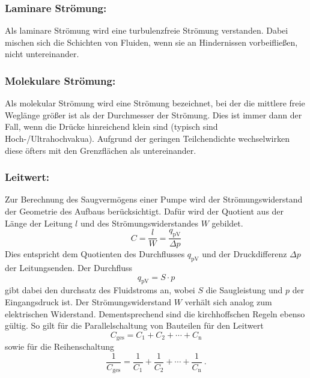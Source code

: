 \subsubsection{Laminare Strömung:}
Als laminare Strömung wird eine turbulenzfreie Strömung verstanden. Dabei mischen sich die Schichten von Fluiden, wenn sie an Hindernissen vorbeifließen, nicht untereinander.

\subsubsection{Molekulare Strömung:}
Als molekular Strömung wird eine Strömung bezeichnet, bei der die mittlere freie Weglänge größer ist als der Durchmesser der Strömung. Dies ist immer dann der Fall, wenn die Drücke hinreichend klein sind (typisch sind Hoch-/Ultrahochvakua). Aufgrund der geringen Teilchendichte wechselwirken diese öfters mit den Grenzflächen als untereinander.

\subsubsection{Leitwert:}
Zur Berechnung des Saugvermögens einer Pumpe wird der Strömungswiderstand der Geometrie des Aufbaus berücksichtigt. Dafür wird der Quotient aus der Länge der Leitung $l$ und des Strömungswiderstandes $W$ gebildet.
\begin{equation}\label{eqn:Leitwert}
  C = \frac{l}{W} = \frac{q_\text{pV}}{\Delta p}
\end{equation}
Dies entspricht dem Quotienten des Durchflusses $q_\text{pV}$ und der Druckdifferenz $\Delta p$ der Leitungsenden. Der Durchfluss
\begin{equation}
 q_\text{pV} = S \cdot p
  \label{eqn:durch}
\end{equation}
gibt dabei den durchsatz des Fluidstroms an, wobei $S$ die Saugleistung und $p$ der Eingangsdruck ist. Der Strömungswiderstand $W$ verhält sich analog zum elektrischen Widerstand. Dementsprechend sind die kirchhoffschen Regeln ebenso gültig. So gilt für die Parallelschaltung von Bauteilen für den Leitwert
\begin{equation}
  C_\text{ges} = C_1 + C_2 + \cdots + C_\text{n}
  \label{eqn:LeitParallel}
\end{equation}
sowie für die Reihenschaltung
\begin{equation}
  \frac{1}{C_\text{ges}} = \frac{1}{C_1} + \frac{1}{C_2} + \cdots + \frac{1}{C_\text{n}} \ .
  \label{eqn:LeitReihe}
\end{equation}

